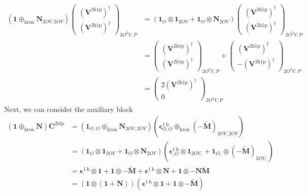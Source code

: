 \begin{align}
    \left( \bm{1} \oplus_{\text{kron}} \bm{N}_{2OV,2OV} \right) \begin{pmatrix}
        \left(\bm{V}^{2\mathrm{h1p}}\right)^{\dagger} \\ \left( \bm{V}^{2\mathrm{h1p}}\right)^{\dagger}
    \end{pmatrix} _{2O^2V,P} &=\left( \bm{1}_O \otimes \bm{1}_{2OV} + \bm{1}_O \otimes \bm{N}_{2OV} \right) \begin{pmatrix}
        \left(\bm{V}^{2\mathrm{h1p}}\right)^{\dagger} \\ \left( \bm{V}^{2\mathrm{h1p}}\right)^{\dagger}
    \end{pmatrix} _{2O^2V,P}\\
& =\begin{pmatrix}
        \left(\bm{V}^{2\mathrm{h1p}}\right)^{\dagger} \\ \left( \bm{V}^{2\mathrm{h1p}}\right)^{\dagger}
    \end{pmatrix} _{2O^2V,P} + \begin{pmatrix}
        \left(\bm{V}^{2\mathrm{h1p}}\right)^{\dagger} \\ -\left( \bm{V}^{2\mathrm{h1p}}\right)^{\dagger}
    \end{pmatrix} _{2O^2V,P} \\
&= \begin{pmatrix}
        2\left(\bm{V}^{2\mathrm{h1p}}\right)^{\dagger} \\ 0
    \end{pmatrix} _{2O^2V,P}
\end{align}
Next, we can consider the auxiliary block
\begin{align}
 \left( \bm{1} \oplus_{\text{kron}} \bm{N} \right)\bm{C}^{2\mathrm{hlp}} &= \left(\bm{1}_{O,O} \oplus_{\text{kron}} \bm{N}_{2OV,2OV}\right) \left( \bm{\epsilon}^{1 \mathrm{~h}}_{O,O} \oplus_{\text{kron}} (-\bm{\tilde{M}})_{2OV,2OV} \right)\\
&= \left( \bm{1}_O \otimes \bm{1}_{2OV} + \bm{1}_O \otimes \bm{N}_{2OV} \right) \left( \bm{\epsilon}^{1 \mathrm{~h}}_{,O} \otimes \bm{1}_{2OV,} + \bm{1}_{O,} \otimes (-\bm{\tilde{M}})_{2OV,} \right)\\
&= \bm{\epsilon}^{1 \mathrm{~h}} \otimes \bm{1} + \bm{1} \otimes -\bm{\tilde{M}} + \bm{\epsilon}^{1 \mathrm{~h}} \otimes \bm{N} + \bm{1} \otimes -\bm{N}\bm{\tilde{M}}\\
&= \left( \bm{1} \otimes \left( \bm{1} + \bm{N} \right) \right) \left( \bm{\epsilon}^{1 \mathrm{~h}} \otimes \bm{1} + \bm{1} \otimes -\bm{\tilde{M}} \right) \\
\end{align}
